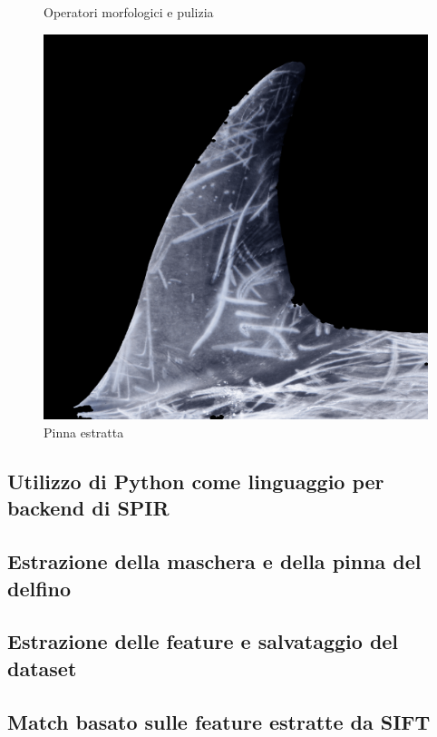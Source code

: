 \documentclass[a4paper,12pt]{report}
\begin{document}
\begin{figure}
\begin{minipage}{0.25\textwidth}
          \caption{Operatori morfologici e pulizia}
        \end{minipage}
        \begin{minipage}{0.25\textwidth}
          \centering
          \includegraphics[width=\textwidth]{assets/images/fin_extraction/test_out.png}   
          \caption{Pinna estratta}
        \end{minipage}
      \end{figure}

      \subsection{Utilizzo di Python come linguaggio per backend di SPIR}
    \subsection{Estrazione della maschera e della pinna del delfino}
    \subsection{Estrazione delle feature e salvataggio del dataset}
    \subsection{Match basato sulle feature estratte da SIFT}
\end{document}
